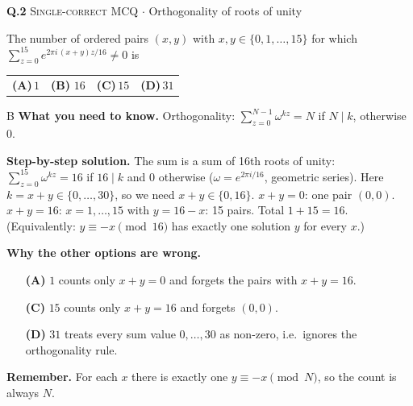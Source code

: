 \documentclass[11pt,a4paper]{article}
\newcommand{\optlabel}[1]{\textbf{(#1)}}
\newcommand{\correctlabel}[1]{\textcolor{okgreen}{\textbf{(#1)}\,\ding{51}}}
\newenvironment{qitem}[1]{\begin{list}{}{\setlength{\leftmargin}{3.3em}\setlength{\labelwidth}{3.1em}%
  \setlength{\labelsep}{0.2em}\setlength{\topsep}{3pt}\setlength{\parsep}{3pt}}\item[\textbf{Q.#1}\hfill]}{\end{list}}
\newcommand{\qsep}{\par\vspace{2pt}{\color{black!15}\hrule}\vspace{4pt}}
\newcommand{\qmeta}[2]{{\footnotesize\color{black!60}\textsc{#1} \;$\cdot$\; #2}\par}
\begin{document}
\begin{qitem}{2}
\qmeta{Single-correct MCQ}{Orthogonality of roots of unity}
The number of ordered pairs $(x, y)$ with $x, y \in \{0, 1, \dots, 15\}$ for which
$\displaystyle \sum_{z=0}^{15} e^{2\pi i\,(x+y)z/16} \neq 0$ is
\par\smallskip\noindent\begin{tabularx}{\linewidth}{@{}*{4}{L}@{}}
\optlabel{A}\,$1$ & \correctlabel{B}\,$16$ & \optlabel{C}\,$15$ & \optlabel{D}\,$31$
\end{tabularx}
\end{qitem}
\begin{solbox}{B}
\textbf{\color{brand}What you need to know.} Orthogonality: $\sum_{z=0}^{N-1}\omega^{kz} = N$ if $N \mid k$, otherwise $0$.

\textbf{\color{brand}Step-by-step solution.} The sum is a sum of 16th roots of unity: $\sum_{z=0}^{15} \omega^{kz} = 16$ if $16 \mid k$ and $0$ otherwise
($\omega = e^{2\pi i/16}$, geometric series). Here $k = x + y \in \{0, \dots, 30\}$, so we need $x + y \in \{0, 16\}$.
$x + y = 0$: one pair $(0,0)$. $x + y = 16$: $x = 1, \dots, 15$ with $y = 16 - x$: 15 pairs. Total $1 + 15 = 16$.
(Equivalently: $y \equiv -x \pmod{16}$ has exactly one solution $y$ for every $x$.)

\textbf{\color{brand}Why the other options are wrong.}
\begin{itemize}[leftmargin=2.4em, itemsep=1pt, topsep=2pt]
\item[\textbf{(A)}] $1$ counts only $x + y = 0$ and forgets the pairs with $x + y = 16$.
\item[\textbf{(C)}] $15$ counts only $x + y = 16$ and forgets $(0, 0)$.
\item[\textbf{(D)}] $31$ treats every sum value $0, \dots, 30$ as non-zero, i.e.\ ignores the orthogonality rule.
\end{itemize}
\textbf{\color{brand}Remember.} For each $x$ there is exactly one $y \equiv -x \pmod N$, so the count is always $N$.
\end{solbox}
\qsep
\end{document}
